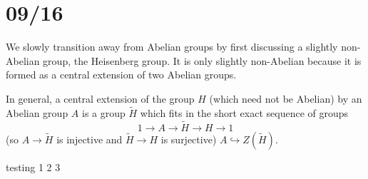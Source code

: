 \section{09/16}
We slowly transition away from Abelian groups by first discussing a slightly non-Abelian group, the Heisenberg group. It is only slightly non-Abelian because it is formed as a central extension of two Abelian groups. 

In general, a central extension of the group $H$ (which need not be Abelian) by an Abelian group $A$ is a group $\tilde H$ which fits in the short exact sequence of groups 
\[1\to A\to \widetilde H\to H \to 1\]
(so $A\to \widetilde H$ is injective and $\widetilde H \to H$ is surjective)  $A\hookrightarrow Z(\widetilde H)$.

testing 1 2 3
